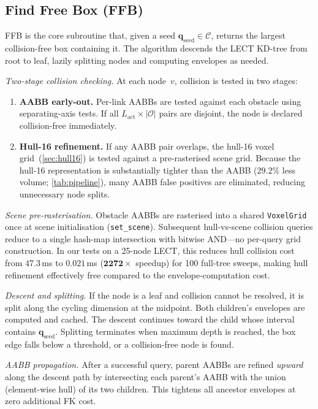 \documentclass[journal]{IEEEtran}
\newcommand{\Cspace}{\mathcal{C}}
\newcommand{\calO}{\mathcal{O}}
\begin{document}
\subsection{Find Free Box (FFB)}\label{sec:ffb}

FFB is the core subroutine that, given a seed
$\bm{q}_\text{seed} \in \Cspace$, returns the largest
collision-free box containing it.
The algorithm descends the LECT KD-tree from root to leaf,
lazily splitting nodes and computing envelopes as needed.

\emph{Two-stage collision checking.}
At each node~$v$, collision is tested in two stages:
\begin{enumerate}
  \item \textbf{AABB early-out.}  Per-link AABBs are tested against
    each obstacle using separating-axis tests.
    If all $L_\text{act} \times |\calO|$ pairs are disjoint,
    the node is declared collision-free immediately.
  \item \textbf{Hull-16 refinement.}  If any AABB pair overlaps,
    the hull-16 voxel grid~(\cref{sec:hull16}) is tested against
    a pre-rasterised scene grid.
    Because the hull-16 representation is substantially tighter
    than the AABB ($29.2\%$ less volume; \cref{tab:pipeline}),
    many AABB false positives are eliminated, reducing
    unnecessary node splits.
\end{enumerate}

\emph{Scene pre-rasterisation.}
Obstacle AABBs are rasterised into a shared \texttt{VoxelGrid}
once at scene initialisation (\texttt{set\_scene}).
Subsequent hull-vs-scene collision queries reduce to a single
hash-map intersection with bitwise AND---no per-query grid
construction.
In our tests on a 25-node LECT, this reduces hull collision
cost from $47.3$\,ms to $0.021$\,ms ($\mathbf{2272{\times}}$ speedup)
for 100 full-tree sweeps, making hull refinement effectively free
compared to the envelope-computation cost.

\emph{Descent and splitting.}
If the node is a leaf and collision cannot be resolved,
it is split along the cycling dimension at the midpoint.
Both children's envelopes are computed and cached.
The descent continues toward the child whose interval contains
$\bm{q}_\text{seed}$.
Splitting terminates when maximum depth is reached,
the box edge falls below a threshold, or a collision-free node
is found.

\emph{AABB propagation.}
After a successful query, parent AABBs are refined
\emph{upward} along the descent path by intersecting each parent's
AABB with the union (element-wise hull) of its two children.
This tightens all ancestor envelopes at zero additional FK cost.
\end{document}
